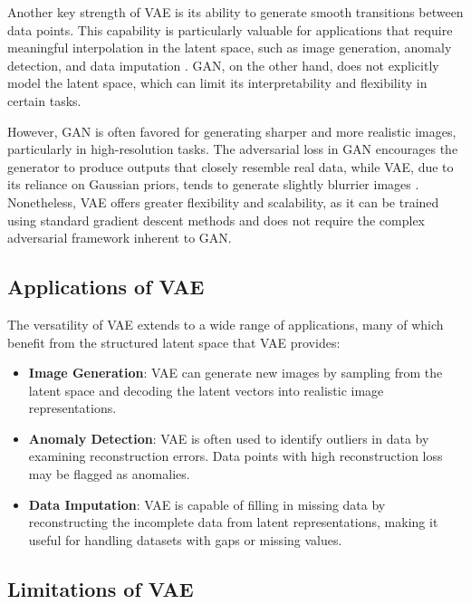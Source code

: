 Another key strength of VAE is its ability to generate smooth transitions between data points. This capability is particularly valuable for applications that require meaningful interpolation in the latent space, such as image generation, anomaly detection, and data imputation \citep{10.1088/2632-2153/ab80b7}\citep{10.48550/arxiv.2002.10464}. GAN, on the other hand, does not explicitly model the latent space, which can limit its interpretability and flexibility in certain tasks.

However, GAN is often favored for generating sharper and more realistic images, particularly in high-resolution tasks. The adversarial loss in GAN encourages the generator to produce outputs that closely resemble real data, while VAE, due to its reliance on Gaussian priors, tends to generate slightly blurrier images \citep{10.1109/access.2020.2977671}. Nonetheless, VAE offers greater flexibility and scalability, as it can be trained using standard gradient descent methods and does not require the complex adversarial framework inherent to GAN.

\subsection{Applications of VAE}

The versatility of VAE extends to a wide range of applications, many of which benefit from the structured latent space that VAE provides:
\begin{itemize}
    \item \textbf{Image Generation}: VAE can generate new images by sampling from the latent space and decoding the latent vectors into realistic image representations.
    \item \textbf{Anomaly Detection}: VAE is often used to identify outliers in data by examining reconstruction errors. Data points with high reconstruction loss may be flagged as anomalies.
    \item \textbf{Data Imputation}: VAE is capable of filling in missing data by reconstructing the incomplete data from latent representations, making it useful for handling datasets with gaps or missing values.
\end{itemize}

\subsection{Limitations of VAE}


